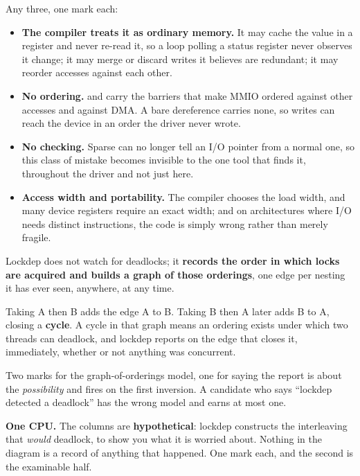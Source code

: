 Any three, one mark each:
\begin{itemize}
  \item \textbf{The compiler treats it as ordinary memory.} It may cache the value in a register and
    never re-read it, so a loop polling a status register never observes it change; it may merge or
    discard writes it believes are redundant; it may reorder accesses against each other.
  \item \textbf{No ordering.}  and  carry the barriers that make MMIO
    ordered against other accesses and against DMA. A bare dereference carries none, so writes can
    reach the device in an order the driver never wrote.
  \item \textbf{No  checking.} Sparse can no longer tell an I/O pointer from a normal
    one, so this class of mistake becomes invisible to the one tool that finds it, throughout the
    driver and not just here.
  \item \textbf{Access width and portability.} The compiler chooses the load width, and many device
    registers require an exact width; and on architectures where I/O needs distinct instructions,
    the code is simply wrong rather than merely fragile.
\end{itemize}


Lockdep does not watch for deadlocks; it \textbf{records the order in which locks are acquired and
builds a graph of those orderings}, one edge per nesting it has ever seen, anywhere, at any time.

Taking A then B adds the edge A to B. Taking B then A later adds B to A, closing a \textbf{cycle}. A
cycle in that graph means an ordering exists under which two threads can deadlock, and lockdep
reports on the edge that closes it, immediately, whether or not anything was concurrent.

Two marks for the graph-of-orderings model, one for saying the report is about the
\emph{possibility} and fires on the first inversion. A candidate who says ``lockdep detected a
deadlock'' has the wrong model and earns at most one.

\textbf{One CPU.} The columns are \textbf{hypothetical}: lockdep constructs the interleaving that
\emph{would} deadlock, to show you what it is worried about. Nothing in the diagram is a record of
anything that happened. One mark each, and the second is the examinable half.


